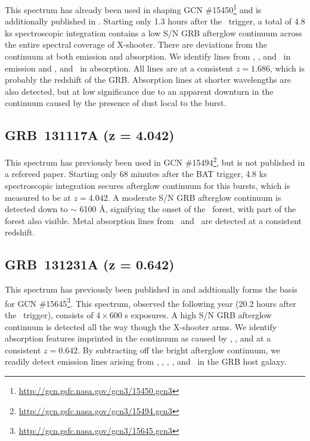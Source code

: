 \documentclass{aa}    %
\begin{document}
This spectrum has already been used in shaping GCN
\#15450\footnote{\url{http://gcn.gsfc.nasa.gov/gcn3/15450.gcn3}} and is
additionally published in \citet{Kruhler2015}. Starting only 1.3 hours after the
\swift~trigger, a total of 4.8 ks spectroscopic integration contains a low S/N
GRB afterglow continuum across the entire spectral coverage of X-shooter. There
are deviations from the continuum at both emission and absorption. We identify
lines from \hb, \oiii, and \ha~in emission and \feii, and \mgii~in absorption.
All lines are at a consistent $z = 1.686$, which is probably the redshift of the
GRB. Absorption lines at shorter wavelengths are also detected, but at low
significance due to an apparent downturn in the continuum caused by the presence
of dust local to the burst.

\subsection{GRB~131117A (z = 4.042)}	

This spectrum has previously been used in GCN
\#15494\footnote{\url{http://gcn.gsfc.nasa.gov/gcn3/15494.gcn3}}, but is not
published in a refereed paper. Starting only 68 minutes after the BAT trigger,
4.8 ks spectroscopic integration secures afterglow continuum for this bursts,
which is measured to be at $z = 4.042$. A moderate S/N GRB afterglow continuum
is detected down to $\sim$ 6100 \AA, signifying the onset of the \lya~forest,
with part of the forest also visible. Metal absorption lines from \SIii~and
\SIiv~are detected at a consistent redshift.

\subsection{GRB~131231A (z = 0.642)}	

This spectrum has previously been published in \citet{Kruhler2015} and
addtionally forms the basis for GCN
\#15645\footnote{\url{http://gcn.gsfc.nasa.gov/gcn3/15645.gcn3}}. This spectrum,
observed the following year (20.2 hours after the \swift~trigger), consists of
$4\times600$ s exposures. A high S/N GRB afterglow continuum is detected all the
way though the X-shooter arms. We identify absorption features imprinted in the
continuum as caused by \feii, \mgii, and \cahk at a consistent $z = 0.642$. By
subtracting off the bright afterglow continuum, we readily detect emission lines
arising from \oii, \hg, \hb, \oiii, and \ha~in the GRB host galaxy.
\end{document}
